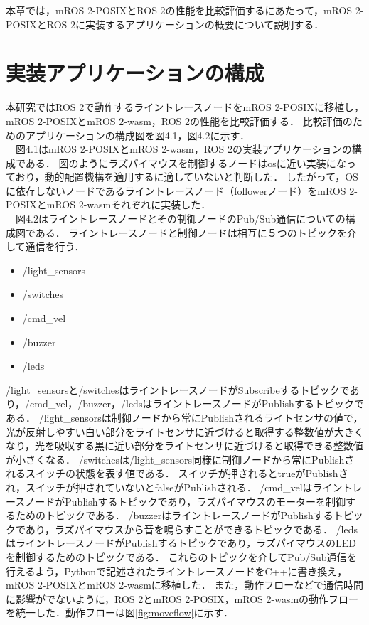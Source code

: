 本章では，mROS 2-POSIXとROS 2の性能を比較評価するにあたって，mROS 2-POSIXとROS 2に実装するアプリケーションの概要について説明する．
\section{実装アプリケーションの構成}
本研究ではROS 2で動作するライントレースノードをmROS 2-POSIXに移植し，mROS 2-POSIXとmROS 2-wasm，ROS 2の性能を比較評価する．
比較評価のためのアプリケーションの構成図を図4.1，図4.2に示す．
\\　図4.1はmROS 2-POSIXとmROS 2-wasm，ROS 2の実装アプリケーションの構成である．
図のようにラズパイマウスを制御するノードはosに近い実装になっており，動的配置機構を適用するに適していないと判断した．
したがって，OSに依存しないノードであるライントレースノード（followerノード）をmROS 2-POSIXとmROS 2-wasmそれぞれに実装した．
\\　図4.2はライントレースノードとその制御ノードのPub/Sub通信についての構成図である．
ライントレースノードと制御ノードは相互に５つのトピックを介して通信を行う．
\begin{itemize}
    \item /light\_sensors
    \item /switches
    \item /cmd\_vel
    \item /buzzer
    \item /leds
\end{itemize}
/light\_sensorsと/switchesはライントレースノードがSubscribeするトピックであり，/cmd\_vel，/buzzer，/ledsはライントレースノードがPublishするトピックである．
/light\_sensorsは制御ノードから常にPublishされるライトセンサの値で，光が反射しやすい白い部分をライトセンサに近づけると取得する整数値が大きくなり，光を吸収する黒に近い部分をライトセンサに近づけると取得できる整数値が小さくなる．
/switchesは/light\_sensors同様に制御ノードから常にPublishされるスイッチの状態を表す値である．
スイッチが押されるとtrueがPublishされ，スイッチが押されていないとfalseがPublishされる．
/cmd\_velはライントレースノードがPublishするトピックであり，ラズパイマウスのモーターを制御するためのトピックである．
/buzzerはライントレースノードがPublishするトピックであり，ラズパイマウスから音を鳴らすことができるトピックである．
/ledsはライントレースノードがPublishするトピックであり，ラズパイマウスのLEDを制御するためのトピックである．
これらのトピックを介してPub/Sub通信を行えるよう，Pythonで記述されたライントレースノードをC++に書き換え，mROS 2-POSIXとmROS 2-wasmに移植した．
また，動作フローなどで通信時間に影響がでないように，ROS 2とmROS 2-POSIX，mROS 2-wasmの動作フローを統一した．動作フローは図\ref{fig:moveflow}に示す．

